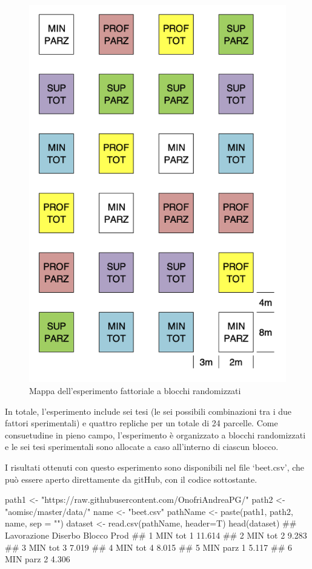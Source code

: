 \documentclass[a4paper,12pt,oneside]{book}
\newenvironment{Shaded}{}{}
\newcommand{\KeywordTok}[1]{#1}
\newcommand{\DataTypeTok}[1]{#1}
\newcommand{\StringTok}[1]{#1}
\newcommand{\CommentTok}[1]{#1}
\newcommand{\NormalTok}[1]{#1}
\begin{document}
\begin{figure}

{\centering \includegraphics[width=0.45\linewidth]{_images/Mappa3FATT} 

}

\caption{Mappa dell'esperimento fattoriale a blocchi randomizzati}\label{fig:figName132}
\end{figure}

In totale, l'esperimento include sei tesi (le sei possibili combinazioni tra i due fattori sperimentali) e quattro repliche per un totale di 24 parcelle. Come consuetudine in pieno campo, l'esperimento è organizzato a blocchi randomizzati e le sei tesi sperimentali sono allocate a caso all'interno di ciascun blocco.

I risultati ottenuti con questo esperimento sono disponibili nel file `beet.csv', che può essere aperto direttamente da gitHub, con il codice sottostante.

\begin{Shaded}
\begin{Highlighting}[]
\NormalTok{path1 <-}\StringTok{ "https://raw.githubusercontent.com/OnofriAndreaPG/"}
\NormalTok{path2 <-}\StringTok{ "aomisc/master/data/"}
\NormalTok{name <-}\StringTok{ "beet.csv"}
\NormalTok{pathName <-}\StringTok{ }\KeywordTok{paste}\NormalTok{(path1, path2, name, }\DataTypeTok{sep =} \StringTok{""}\NormalTok{)}
\NormalTok{dataset <-}\StringTok{ }\KeywordTok{read.csv}\NormalTok{(pathName, }\DataTypeTok{header=}\NormalTok{T)}
\KeywordTok{head}\NormalTok{(dataset)}
\CommentTok{##   Lavorazione Diserbo Blocco   Prod}
\CommentTok{## 1         MIN     tot      1 11.614}
\CommentTok{## 2         MIN     tot      2  9.283}
\CommentTok{## 3         MIN     tot      3  7.019}
\CommentTok{## 4         MIN     tot      4  8.015}
\CommentTok{## 5         MIN    parz      1  5.117}
\CommentTok{## 6         MIN    parz      2  4.306}
\end{Highlighting}
\end{Shaded}
\end{document}
